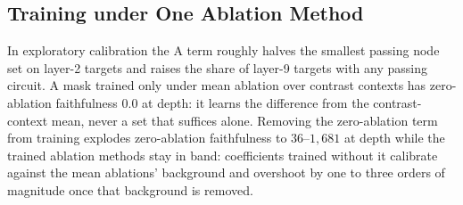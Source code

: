\documentclass[10pt]{article}
\begin{document}
\subsection{Training under One Ablation Method}
\label{app:single-method}
In exploratory calibration the A term roughly halves the smallest passing node set on layer-2 targets and raises the share of layer-9 targets with any passing circuit.
A mask trained only under mean ablation over contrast contexts has zero-ablation faithfulness $0.0$ at depth: it learns the difference from the contrast-context mean, never a set that suffices alone.
Removing the zero-ablation term from training explodes zero-ablation faithfulness to $36$--$1{,}681$ at depth while the trained ablation methods stay in band: coefficients trained without it calibrate against the mean ablations' background and overshoot by one to three orders of magnitude once that background is removed.
\end{document}
